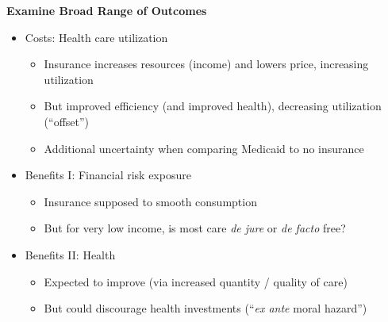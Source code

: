 \documentclass[notes=show]{beamer}
\begin{document}
\begin{frame}[plain]
	\begin{center}
	\textbf{Examine Broad Range of Outcomes}
	\end{center}
	
	\begin{itemize}
	\item Costs: Health care utilization
		\begin{itemize}
		\item Insurance increases resources (income) and lowers price, increasing utilization
		\item But improved efficiency (and improved health), decreasing utilization (``offset'')
		\item Additional uncertainty when comparing Medicaid to no insurance
		\end{itemize}
	\item Benefits I: Financial risk exposure
		\begin{itemize}
		\item Insurance supposed to smooth consumption
		\item But for very low income, is most care \emph{de jure} or \emph{de facto} free?
		\end{itemize}
	\item Benefits II: Health
		\begin{itemize}
		\item Expected to improve (via increased quantity / quality of care)
		\item But could discourage health investments (``\emph{ex ante} moral hazard'')
		\end{itemize}
	\end{itemize}
\end{frame}
\end{document}
